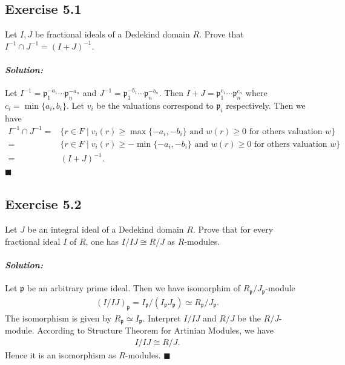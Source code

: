 \documentclass[12pt, a4paper]{article}
\newcommand{\p}{\mathfrak{p}}
\newenvironment{solution}
  {\paragraph{\textit{Solution:}}\par\medskip}
  {\hfill$\blacksquare$\vspace{0.1cm}}
\begin{document}
\subsection*{Exercise 5.1}
Let $I, J$ be fractional ideals of a Dedekind domain $R$. Prove that $I^{-1} \cap J^{-1} = (I + J)^{-1}$.
\begin{solution}
    Let $I^{-1} = \p_1^{-a_1}\cdots \p_n^{-a_n}$ and $J^{-1}=\p_1^{-b_1}\cdots \p_n^{-b_n}$.
    Then $I+J = \p_1^{c_1}\cdots \p_n^{c_n}$ where $c_i=\min\{a_i,b_i\}$.
    Let $v_i$ be the valuations correspond to $\p_i$ respectively.
    Then we have 
    \begin{align*}
        I^{-1}\cap J^{-1} =& \{r\in F\mid v_i(r)\ge \max\{-a_i,-b_i\}\text{ and $w(r)\ge 0$ for others valuation $w$}\}\\
        =& \{r\in F\mid v_i(r)\ge -\min\{-a_i,-b_i\}\text{ and $w(r)\ge 0$ for others valuation $w$}\} \\
        =& (I+J)^{-1}.
    \end{align*}
\end{solution}



\subsection*{Exercise 5.2}
Let $J$ be an integral ideal of a Dedekind domain $R$. Prove that for every fractional ideal $I$ of $R$, one has $I/IJ \cong R/J$ as $R$-modules.
\begin{solution}
    Let $\p$ be an arbitrary prime ideal. Then we have isomorphim of $R_\p/J_\p$-module
    \begin{align*}
        (I/IJ)_\p = I_\p/(I_\p J_\p) \simeq R_\p/J_\p.
    \end{align*}
    The isomorphism is given by $R_\p\simeq I_\p$. 
    Interpret $I/IJ$ and $R/J$ be the $R/J$-module. 
    According to Structure Theorem for Artinian Modules, we have 
    \begin{align*}
        I/IJ \cong R/J.
    \end{align*}
    Hence it is an isomorphism as $R$-modules.
\end{solution}
\end{document}
